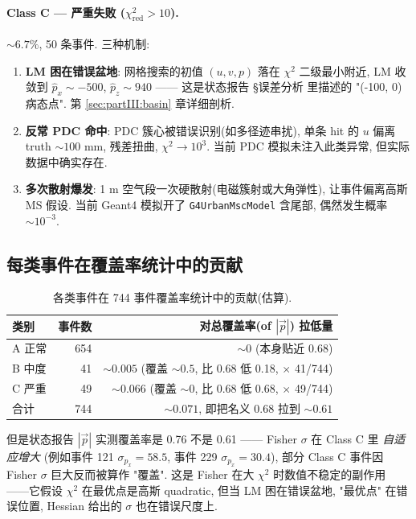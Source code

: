 \paragraph{Class C — 严重失败 ($\chi^2_{\mathrm{red}} > 10$).}
$\sim 6.7\%$, 50 条事件. 三种机制:
\begin{enumerate}[label=(\arabic*), nosep]
  \item \textbf{LM 困在错误盆地}: 网格搜索的初值 $(u, v, p)$ 落在 $\chi^2$ 二级最小附近, LM 收敛到 $\hat p_x \sim -500$, $\hat p_z \sim 940$ —— 这是状态报告 §误差分析 里描述的 "(-100, 0) 病态点". 第 \ref{sec:partIII:basin} 章详细剖析.
  \item \textbf{反常 PDC 命中}: PDC 簇心被错误识别(如多径迹串扰), 单条 hit 的 $u$ 偏离 truth $\sim 100$ mm, 残差扭曲, $\chi^2 \to 10^3$. 当前 PDC 模拟未注入此类异常, 但实际数据中确实存在.
  \item \textbf{多次散射爆发}: 1 m 空气段一次硬散射(电磁簇射或大角弹性), 让事件偏离高斯 MS 假设. 当前 Geant4 模拟开了 \texttt{G4UrbanMscModel} 含尾部, 偶然发生概率 $\sim 10^{-3}$.
\end{enumerate}

\subsection{每类事件在覆盖率统计中的贡献}
\label{sec:partIII:chi2:contribution}

\begin{table}[H]
\centering\small
\caption{各类事件在 744 事件覆盖率统计中的贡献(估算).}
\label{tab:partIII:chi2_class_contribution}
\begin{tabular}{lrr}
\toprule
类别 & 事件数 & 对总覆盖率(of $|\vec p|$) 拉低量 \\
\midrule
A 正常 & 654 & $\sim 0$ (本身贴近 0.68) \\
B 中度 & 41  & $\sim 0.005$ (覆盖 $\sim 0.5$, 比 0.68 低 0.18, $\times$ 41/744) \\
C 严重 & 49  & $\sim 0.066$ (覆盖 $\sim 0$, 比 0.68 低 0.68, $\times$ 49/744) \\
\midrule
合计    & 744 & $\sim 0.071$, 即把名义 0.68 拉到 $\sim 0.61$ \\
\bottomrule
\end{tabular}
\end{table}

但是状态报告 $|\vec p|$ 实测覆盖率是 0.76 不是 0.61 —— Fisher $\sigma$ 在 Class C 里 \emph{自适应增大} (例如事件 121 $\sigma_{p_x} = 58.5$, 事件 229 $\sigma_{p_x} = 30.4$), 部分 Class C 事件因 Fisher $\sigma$ 巨大反而被算作 "覆盖". 这是 Fisher 在大 $\chi^2$ 时数值不稳定的副作用 ——它假设 $\chi^2$ 在最优点是高斯 quadratic, 但当 LM 困在错误盆地, "最优点" 在错误位置, Hessian 给出的 $\sigma$ 也在错误尺度上.

